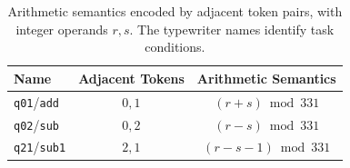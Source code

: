 \begin{table}[htbp]
    \centering
    \caption{Arithmetic semantics encoded by adjacent token pairs, with integer operands $r,s$. The typewriter names identify task conditions.}
    \label{tab:arithmetic-semantics}
    \small
    \begin{tabular*}{0.9\linewidth}{@{\extracolsep{\fill}}lcc@{}}
        \toprule
        \textbf{Name} & \textbf{Adjacent Tokens} & \textbf{Arithmetic Semantics} \\
        \midrule
        \texttt{q01}/\texttt{add}  & $0,1$ & $(r+s) \bmod 331$ \\
        \texttt{q02}/\texttt{sub}  & $0,2$ & $(r-s) \bmod 331$ \\
        \texttt{q21}/\texttt{sub1} & $2,1$ & $(r-s-1) \bmod 331$ \\
        \bottomrule
    \end{tabular*}
\end{table}
